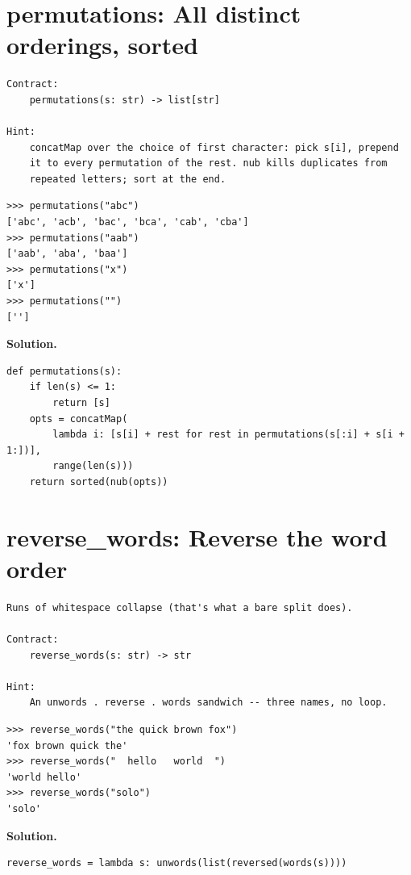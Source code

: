\documentclass[10pt,letterpaper]{book}
\begin{document}
\section{permutations: All distinct orderings, sorted}
\begin{lstlisting}[style=ex]
Contract:
    permutations(s: str) -> list[str]

Hint:
    concatMap over the choice of first character: pick s[i], prepend
    it to every permutation of the rest. nub kills duplicates from
    repeated letters; sort at the end.
\end{lstlisting}
\begin{lstlisting}[style=ex]
>>> permutations("abc")
['abc', 'acb', 'bac', 'bca', 'cab', 'cba']
>>> permutations("aab")
['aab', 'aba', 'baa']
>>> permutations("x")
['x']
>>> permutations("")
['']
\end{lstlisting}
\noindent\textbf{Solution.}
\begin{lstlisting}[style=code]
def permutations(s):
    if len(s) <= 1:
        return [s]
    opts = concatMap(
        lambda i: [s[i] + rest for rest in permutations(s[:i] + s[i + 1:])],
        range(len(s)))
    return sorted(nub(opts))
\end{lstlisting}

\section{reverse\_words: Reverse the word order}
\begin{lstlisting}[style=ex]
Runs of whitespace collapse (that's what a bare split does).

Contract:
    reverse_words(s: str) -> str

Hint:
    An unwords . reverse . words sandwich -- three names, no loop.
\end{lstlisting}
\begin{lstlisting}[style=ex]
>>> reverse_words("the quick brown fox")
'fox brown quick the'
>>> reverse_words("  hello   world  ")
'world hello'
>>> reverse_words("solo")
'solo'
\end{lstlisting}
\noindent\textbf{Solution.}
\begin{lstlisting}[style=code]
reverse_words = lambda s: unwords(list(reversed(words(s))))
\end{lstlisting}
\end{document}
